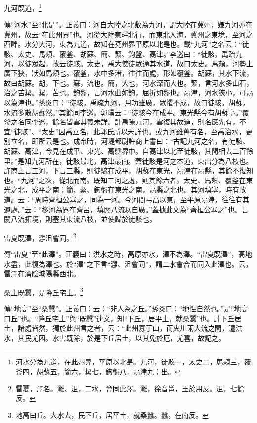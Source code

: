 九河既道，\footnote{河水分為九道，在此州界，平原以北是。九河，徒駭一，太史二，馬頰三，覆釜四，胡蘇五，簡六，絜七，鉤盤八，鬲津九；出。}

{\noindent\zhuan{}\fzbyks 傳“河水”至“北是”。正義曰：河自大陸之北敷為九河，謂大陸在冀州，嫌九河亦在冀州，故云“在此州界”也。河從大陸東畔北行，而東北入海。冀州之東境，至河之西畔。水分大河，東為九道，故知在兗州界平原以北是也。載“九河”之名云：“徒駭、太史、馬頰、覆釜、胡蘇、簡、絜、鉤盤、鬲津。”李巡曰：“徒駭，禹疏九河，以徒眾起，故云徒駭。太史，禹大使徒眾通其水道，故曰太史。馬頰，河勢上廣下狹，狀如馬頰也。覆釜，水中多渚，往往而處，形如覆釜。胡蘇，其水下流，故曰胡蘇。胡，下也。蘇，流也。簡，大也，河水深而大也。絜，言河水多山石，治之苦絜。絜，苫也。鉤盤，言河水曲如鉤，屈折如盤也。鬲津，河水狹小，可鬲以為津也。”孫炎曰：“徒駭，禹疏九河，用功雖廣，眾懼不成，故曰徒駭。胡蘇，水流多散胡蘇然。”其餘同李巡。郭璞云：“徒駭今在成平。東光縣今有胡蘇亭。”覆釜之名同李巡，餘名皆雲其義未詳。計禹陳九河，雲復其故道，則名應先有，不宜“徒駭”、“太史”因禹立名，此郭氏所以未詳也。或九河雖舊有名，至禹治水，更別立名，即所云是也。成帝時，河堤都尉許商上書曰：“古記九河之名，有徒駭、胡蘇、鬲津，今見在成平、東光、鬲縣界中。自鬲津以北至徒駭，其間相去二百餘里。”是知九河所在，徒駭最北，鬲津最南。蓋徒駭是河之本道，東出分為八枝也。許商上言三河，下言三縣，則徒駭在成平，胡蘇在東光，鬲津在鬲縣，其餘不復知也。“九河”之次，從北而南。既知三河之處，則其餘六者，太史、馬頰、覆釜在東光之北，成平之南；簡、絜、鉤盤在東光之南，鬲縣之北也。其河填塞，時有故道。云：“周時齊桓公塞之，同為一河。今河間弓高以東，至平原鬲津，往往有其遺處。”云：“移河為界在齊呂，填閼八流以自廣。”蓋據此文為“齊桓公塞之”也。言閼八流拓境，則塞其東流八枝，並使歸於徒駭也。 \par}

雷夏既澤，灉沮會同。\footnote{雷夏，澤名。灉、沮，二水，會同此澤。灉，徐音邕，王於用反。沮，七餘反。}

{\noindent\zhuan{}\fzbyks 傳“雷夏”至“此澤”。正義曰：洪水之時，高原亦水，澤不為澤。“雷夏既澤”，高地水盡，此復為澤也。於“澤”之下言“灉、沮會同”，謂二水會合而同入此澤也。云，雷澤在濟陰城陽縣西北。 \par}

桑土既蠶，是降丘宅土。\footnote{地高曰丘。大水去，民下丘，居平土，就桑蠶。蠶，在南反。}

{\noindent\zhuan{}\fzbyks 傳“地高”至“桑蠶”。正義曰：云：“非人為之丘。”孫炎曰：“地性自然也。”是“地高曰丘”也。“降丘宅土”與“既蠶”連文，知“下丘，居平土，就桑蠶”也。計下丘居土，諸處皆然，獨於此州言之者，云：“此州寡于山，而夾川兩大流之間，遭洪水，其民尤困。水害既除，於是下丘居土，以其免於厄，尤喜，故記之。 \par}

